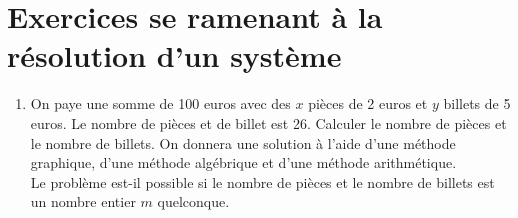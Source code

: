 \documentclass[a4paper,11pt]{book}
\begin{document}
\section{Exercices se ramenant \`a la r\'esolution d'un syst\`eme}
\begin{enumerate}
\item
On paye une somme de 100 euros avec des $x$ pi\`eces de 2 euros et $y$  billets
 de 5 euros. Le nombre de pi\`eces et de billet est 26.
Calculer le nombre de pi\`eces et le nombre de billets. On donnera une solution
\`a l'aide d'une m\'ethode graphique, d'une m\'ethode alg\'ebrique et d'une 
m\'ethode arithm\'etique.\\
Le probl\`eme est-il possible si le nombre de pi\`eces et le nombre de billets
est un nombre entier $m$ quelconque.\\


\end{enumerate}
\end{document}
